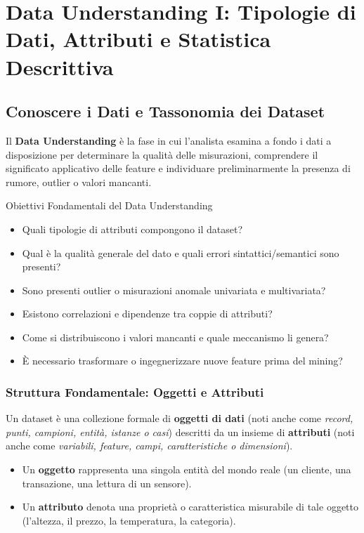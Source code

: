 \chapter{Data Understanding I: Tipologie di Dati, Attributi e Statistica Descrittiva}
\label{ch:data-understanding-types-statistics}

\section{Conoscere i Dati e Tassonomia dei Dataset}

Il \textbf{Data Understanding} \`e la fase in cui l'analista esamina a fondo i dati a disposizione per determinare la qualit\`a delle misurazioni, comprendere il significato applicativo delle feature e individuare preliminarmente la presenza di rumore, outlier o valori mancanti.

\begin{noteblock}{Obiettivi Fondamentali del Data Understanding}
\begin{itemize}
    \item Quali tipologie di attributi compongono il dataset?
    \item Qual \`e la qualit\`a generale del dato e quali errori sintattici/semantici sono presenti?
    \item Sono presenti outlier o misurazioni anomale univariata e multivariata?
    \item Esistono correlazioni e dipendenze tra coppie di attributi?
    \item Come si distribuiscono i valori mancanti e quale meccanismo li genera?
    \item \`E necessario trasformare o ingegnerizzare nuove feature prima del mining?
\end{itemize}
\end{noteblock}

\subsection{Struttura Fondamentale: Oggetti e Attributi}
Un dataset \`e una collezione formale di \textbf{oggetti di dati} (noti anche come \textit{record, punti, campioni, entit\`a, istanze o casi}) descritti da un insieme di \textbf{attributi} (noti anche come \textit{variabili, feature, campi, caratteristiche o dimensioni}).
\begin{itemize}
    \item Un \textbf{oggetto} rappresenta una singola entit\`a del mondo reale (un cliente, una transazione, una lettura di un sensore).
    \item Un \textbf{attributo} denota una propriet\`a o caratteristica misurabile di tale oggetto (l'altezza, il prezzo, la temperatura, la categoria).
\end{itemize}

